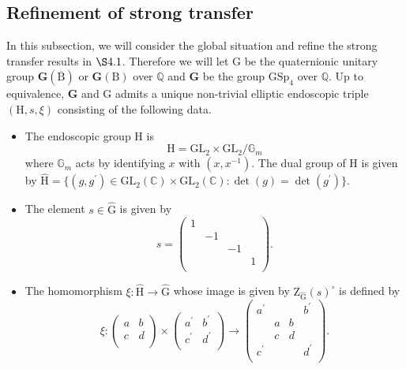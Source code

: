 \documentclass[10pt]{amsart}
\numberwithin{equation}{section}
\theoremstyle{definition}
\def\GL{\mathrm{GL}}
\def\GSp{\mathrm{GSp}}
\def\CC{\mathbb{C}}
\def\bfG{\mathbf{G}}
\def\QQ{\mathbb{Q}}
\def\rmB{\mathrm{B}}
\def\rmG{\mathrm{G}}
\def\rmH{\mathrm{H}}
\def\rmZ{\mathrm{Z}}
\begin{document}
\subsection{Refinement of strong transfer} In this subsection, we will consider the global situation and refine the strong transfer results in $\S 4.1$. Therefore we will let $\rmG$ be the quaternionic unitary group $\bfG(\overline{\rmB})$ or $\bfG(\rmB)$ over $\QQ$ and $\bfG$ be the group $\GSp_{4}$ over $\QQ$. Up to equivalence, $\bfG$ and $\rmG$ admits a unique non-trivial elliptic endoscopic triple $(\rmH, s, \xi)$ consisting of the following data. 
\begin{itemize}
\item The endoscopic group $\rmH$ is 
\begin{equation*}
\rmH=\GL_{2}\times\GL_{2}/\mathbb{G}_{m}
\end{equation*}
where $\mathbb{G}_{m}$ acts by identifying $x$ with $(x, x^{-1})$. The dual group of $\rmH$ is given by $\hat{\rmH}=\{(g, g^{\prime})\in\GL_{2}(\CC)\times\GL_{2}(\CC): \det(g)=\det(g^{\prime})\}$. 

\item  The element $s\in \hat{\rmG}$ is given by
\begin{equation*}
s=\begin{pmatrix}1&&&\\ &-1&&\\ &&-1&\\  &&&1\\ \end{pmatrix}.
\end{equation*}

\item The homomorphism $\xi: \hat{\rmH}\rightarrow \hat{\rmG}$ whose image is given by $\rmZ_{\hat{\rmG}}(s)^{\circ}$ is defined by
\begin{equation*}
\xi: \begin{pmatrix}a&b\\ c&d\\ \end{pmatrix}\times \begin{pmatrix}a^{\prime}&b^{\prime}\\ c^{\prime}&d^{\prime}\\ \end{pmatrix}\rightarrow 
\begin{pmatrix}a^{\prime}&&&b^{\prime}\\ &a&b&\\ &c&d&\\ c^{\prime}&&&d^{\prime}\\ \end{pmatrix}.
\end{equation*}
\end{itemize}
\end{document}
